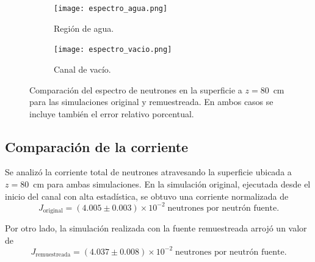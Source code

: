 \begin{figure}[H]
    \centering
    \begin{subfigure}[t]{0.48\textwidth}
        \centering
        \texttt{[image: espectro\_agua.png]}
        \caption{Región de agua.}
        \label{fig:espectro_agua}
    \end{subfigure}
    \hfill
    \begin{subfigure}[t]{0.48\textwidth}
        \centering
        \texttt{[image: espectro\_vacio.png]}
        \caption{Canal de vacío.}
        \label{fig:espectro_vacio}
    \end{subfigure}
    \caption{Comparación del espectro de neutrones en la superficie a $z = 80$~cm para las simulaciones original y remuestreada. En ambos casos se incluye también el error relativo porcentual.}
    \label{fig:espectro_comparacion}
\end{figure}




\subsection{Comparación de la corriente}

Se analizó la corriente total de neutrones atravesando la superficie ubicada a $z = 80$~cm para ambas simulaciones. En la simulación original, ejecutada desde el inicio del canal con alta estadística, se obtuvo una corriente normalizada de
\[
J_{\text{original}} = (4.005 \pm 0.003) \times 10^{-2} \; \text{neutrones por neutrón fuente}.
\]

Por otro lado, la simulación realizada con la fuente remuestreada arrojó un valor de
\[
J_{\text{remuestreada}} = (4.037 \pm 0.008) \times 10^{-2} \; \text{neutrones por neutrón fuente}.
\]

